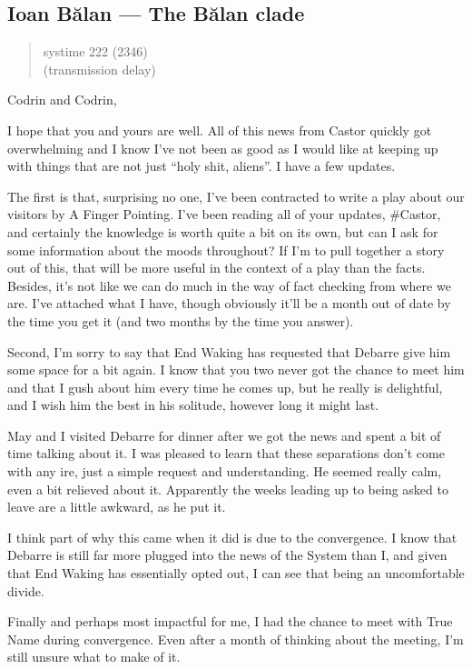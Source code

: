 \hypertarget{ioan-bux103lan-the-bux103lan-clade}{%
\subsection{Ioan Bălan — The Bălan clade}\label{ioan-bux103lan-the-bux103lan-clade}}

\begin{quote}
systime 222 (2346)\\
(transmission delay)
\end{quote}

Codrin and Codrin,

I hope that you and yours are well. All of this news from Castor quickly got overwhelming and I know I've not been as good as I would like at keeping up with things that are not just ``holy shit, aliens''. I have a few updates.

The first is that, surprising no one, I've been contracted to write a play about our visitors by A Finger Pointing. I've been reading all of your updates, \#Castor, and certainly the knowledge is worth quite a bit on its own, but can I ask for some information about the moods throughout? If I'm to pull together a story out of this, that will be more useful in the context of a play than the facts. Besides, it's not like we can do much in the way of fact checking from where we are. I've attached what I have, though obviously it'll be a month out of date by the time you get it (and two months by the time you answer).

Second, I'm sorry to say that End Waking has requested that Debarre give him some space for a bit again. I know that you two never got the chance to meet him and that I gush about him every time he comes up, but he really is delightful, and I wish him the best in his solitude, however long it might last.

May and I visited Debarre for dinner after we got the news and spent a bit of time talking about it. I was pleased to learn that these separations don't come with any ire, just a simple request and understanding. He seemed really calm, even a bit relieved about it. Apparently the weeks leading up to being asked to leave are a little awkward, as he put it.

I think part of why this came when it did is due to the convergence. I know that Debarre is still far more plugged into the news of the System than I, and given that End Waking has essentially opted out, I can see that being an uncomfortable divide.

Finally and perhaps most impactful for me, I had the chance to meet with True Name during convergence. Even after a month of thinking about the meeting, I'm still unsure what to make of it.

